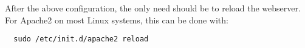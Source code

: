 After the above configuration, the only need should be to reload
the webserver. For Apache2 on most Linux systems, this can be done
with:
\begin{Verbatim}
  sudo /etc/init.d/apache2 reload
\end{Verbatim}
